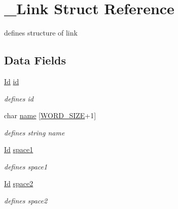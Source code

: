 \hypertarget{struct__Link}{}\section{\+\_\+\+Link Struct Reference}
\label{struct__Link}


defines structure of link  


\subsection*{Data Fields}
\begin{DoxyCompactItemize}
\item 
\mbox{\label{struct__Link_a151212e7a8e8274c2a1ee991ba95878b}} 
\hyperlink{types_8h_a845e604fb28f7e3d97549da3448149d3}{Id} \hyperlink{struct__Link_a151212e7a8e8274c2a1ee991ba95878b}{id}
\begin{DoxyCompactList}\small\item\em defines id \end{DoxyCompactList}\item 
\mbox{\label{struct__Link_a020ee863120055b29609157b9de3c84d}} 
char \hyperlink{struct__Link_a020ee863120055b29609157b9de3c84d}{name} \mbox{[}\hyperlink{types_8h_a92ed8507d1cd2331ad09275c5c4c1c89}{W\+O\+R\+D\+\_\+\+S\+I\+ZE}+1\mbox{]}
\begin{DoxyCompactList}\small\item\em defines string name \end{DoxyCompactList}\item 
\mbox{\label{struct__Link_aabaabaea67e2e626e413fab3324087ff}} 
\hyperlink{types_8h_a845e604fb28f7e3d97549da3448149d3}{Id} \hyperlink{struct__Link_aabaabaea67e2e626e413fab3324087ff}{space1}
\begin{DoxyCompactList}\small\item\em defines space1 \end{DoxyCompactList}\item 
\mbox{\label{struct__Link_aa526fe717007b3865bf2bd7b9dd0655d}} 
\hyperlink{types_8h_a845e604fb28f7e3d97549da3448149d3}{Id} \hyperlink{struct__Link_aa526fe717007b3865bf2bd7b9dd0655d}{space2}
\begin{DoxyCompactList}\small\item\em defines space2 \end{DoxyCompactList}\item 

\end{DoxyCompactItemize}
